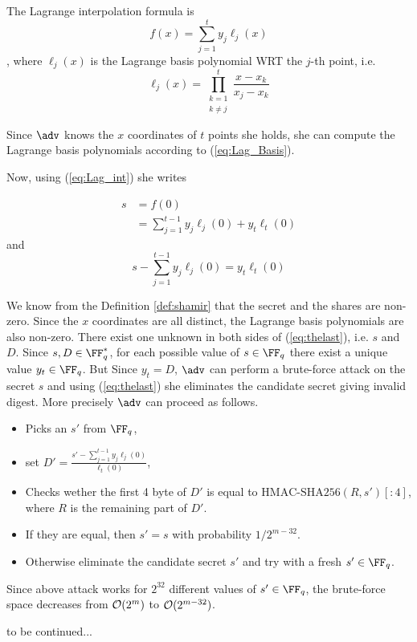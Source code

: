 \documentclass[envcountsame,runningheads,notitlepage]{llncs}
\begin{document}
	The Lagrange interpolation formula is
		\begin{equation}\label{eq:Lag_int}
		f(x) = \sum\limits_{j = 1}^{t} y_{j}\ell_{j}(x)
		\end{equation}
	, where $\ell_{j}(x)$ is the  Lagrange basis polynomial WRT the $j$-th point, i.e.
		\begin{equation}\label{eq:Lag_Basis}
		\ell_{j}(x) = \prod\limits_{\substack{k = 1 \\ k \neq j}}^{t} \frac{x - x_{k}}{x_{j} - x_{k}}
		\end{equation}
	
	Since $\adv$ knows the $x$ coordinates of $t$ points she holds, she can compute the Lagrange basis polynomials according to (\ref{eq:Lag_Basis}). 
	
	Now, using (\ref{eq:Lag_int}) she writes
	
	\begin{align*}
		s &= f(0)\\
		  &= \sum\limits_{j = 1}^{t-1} y_{j}\ell_{j}(0) + y_{t}\ell_{t}(0)
	\end{align*}
	and 
	\begin{equation}\label{eq:thelast}
		s - \sum\limits_{j = 1}^{t-1} y_{j}\ell_{j}(0) = y_{t}\ell_{t}(0)
	\end{equation}
	
	We know from the Definition \ref{def:shamir} that the secret and the shares are non-zero. Since the $x$ coordinates are all distinct, the Lagrange basis polynomials are also non-zero. There exist one unknown in both sides of (\ref{eq:thelast}), i.e. $s$ and $D$. Since $s,D \in \FF_q^{*}$, for each possible value of $s \in \FF_q$ there exist a unique value $y_{t} \in \FF_q$. But Since $y_{t} = D$, $\adv$ can perform a brute-force attack on the secret $s$ and using (\ref{eq:thelast}) she eliminates the candidate secret giving invalid digest. More precisely $\adv$ can proceed as follows.
		\begin{itemize}
			\item Picks an $s'$ from $\FF_q$,
			\item set $D' = \frac{s' - \sum\limits_{j = 1}^{t-1} y_{j}\ell_{j}(0)}{\ell_{t}(0)}$,
			\item Checks wether the first 4 byte of $D'$ is equal to $\textrm{HMAC-SHA256}(R, s')[:4]$, where $R$ is the remaining part of $D'$.
			\item If they are equal, then $s' = s$ with probability $1/2^{m-32}$. 
			\item Otherwise eliminate the candidate secret $s'$ and try with a fresh $s' \in \FF_q$. 
		\end{itemize}
 Since above attack works for $2^{32}$ different values of $s' \in \FF_q$, the brute-force space decreases from ${\mathcal O}(2^{m})$ to ${\mathcal O}(2^{m-32})$. 
	
	to be continued...
	
%

\ifnum{}
  
 \else
   
 \fi

\end{document}
